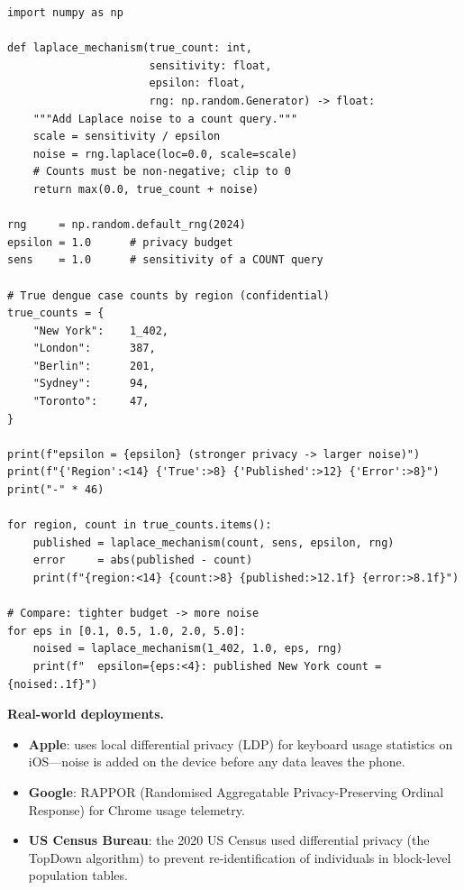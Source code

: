 \begin{lstlisting}[style=pyspark, caption={Differential privacy with the
  Laplace mechanism: publishing district-level case counts}]
import numpy as np

def laplace_mechanism(true_count: int,
                      sensitivity: float,
                      epsilon: float,
                      rng: np.random.Generator) -> float:
    """Add Laplace noise to a count query."""
    scale = sensitivity / epsilon
    noise = rng.laplace(loc=0.0, scale=scale)
    # Counts must be non-negative; clip to 0
    return max(0.0, true_count + noise)

rng     = np.random.default_rng(2024)
epsilon = 1.0      # privacy budget
sens    = 1.0      # sensitivity of a COUNT query

# True dengue case counts by region (confidential)
true_counts = {
    "New York":    1_402,
    "London":      387,
    "Berlin":      201,
    "Sydney":      94,
    "Toronto":     47,
}

print(f"epsilon = {epsilon} (stronger privacy -> larger noise)")
print(f"{'Region':<14} {'True':>8} {'Published':>12} {'Error':>8}")
print("-" * 46)

for region, count in true_counts.items():
    published = laplace_mechanism(count, sens, epsilon, rng)
    error     = abs(published - count)
    print(f"{region:<14} {count:>8} {published:>12.1f} {error:>8.1f}")

# Compare: tighter budget -> more noise
for eps in [0.1, 0.5, 1.0, 2.0, 5.0]:
    noised = laplace_mechanism(1_402, 1.0, eps, rng)
    print(f"  epsilon={eps:<4}: published New York count = {noised:.1f}")
\end{lstlisting}

\textbf{Real-world deployments.}
\begin{itemize}
  \item \textbf{Apple}: uses local differential privacy (LDP) for
        keyboard usage statistics on iOS---noise is added on the
        device before any data leaves the phone.
  \item \textbf{Google}: RAPPOR (Randomised Aggregatable Privacy-Preserving
        Ordinal Response) for Chrome usage telemetry.
  \item \textbf{US Census Bureau}: the 2020 US Census used differential
        privacy (the TopDown algorithm) to prevent re-identification of
        individuals in block-level population tables.
\end{itemize}

